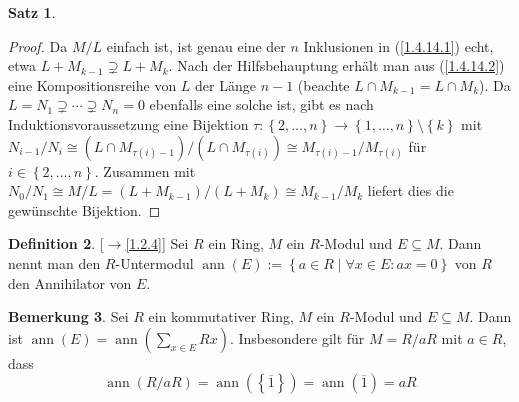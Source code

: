 \documentclass[
twoside=semi,
fontsize=12,
DIV=12, 
cleardoublepage=current,
leqno,
headings=optiontoheadandtoc, 
toc=idx
]{scrbook}
\newcommand{\brac}[1]{\left( #1 \right)}
\newcommand{\set}[1]{\left\{ #1 \right\}}
\DeclareMathOperator{\ann}{ann}
\theoremstyle{definition}
\newtheorem{definition}{Definition}[section]
\newtheorem{bemerkung}[definition]{Bemerkung}
\newtheorem{satz}[definition]{Satz}
\begin{document}
\begin{satz}
\begin{proof}
			\noindent Da $M/L$ einfach ist, ist genau eine der $n$ Inklusionen in (\ref{1.4.14.1}) echt, etwa $L+M_{k-1} \supsetneq L + M_k$. Nach der Hilfsbehauptung erh\"alt man aus (\ref{1.4.14.2}) eine Kompositionsreihe von $L$ der L\"ange $n-1$ (beachte $L\cap M_{k-1} = L\cap M_k$). Da $L=N_1\supsetneq \cdots \supsetneq N_n = 0$ ebenfalls eine solche ist, gibt es nach Induktionsvoraussetzung eine Bijektion $\tau: \set{2, \dots, n} \to \set{1, \dots, n} \setminus \set{k}$ mit $N_{i-1}/N_i \cong (L\cap M_{\tau(i)-1})/(L\cap M_{\tau(i)}) \cong M_{\tau(i)-1} / M_{\tau(i)}$ f\"ur $i \in \set{2,\dots, n}$. Zusammen mit $N_0/N_1 \cong M/L = (L+M_{k-1})/(L+M_k) \cong M_{k-1}/M_k$ liefert dies die gew\"unschte Bijektion.
		\end{proof}
	\end{satz}

	\begin{definition}\label{1.4.15}
		[$\rightarrow$\ref{1.2.4}]\newline
		Sei $R$ ein Ring, $M$ ein $R$-Modul und $E\subseteq M$. Dann nennt man den $R$-Untermodul \linebreak $\ann(E) := \set{a \in R \mid \forall x \in E: ax = 0}$ von $R$ den Annihilator von $E$.
	\end{definition}

	\begin{bemerkung}\label{1.4.16}\hfill\newline
		Sei $R$ ein kommutativer Ring, $M$ ein $R$-Modul und $E\subseteq M$. Dann ist \linebreak $\ann(E)=\ann\brac{\sum_{x\in E} Rx}$. Insbesondere gilt f\"ur $M=R/aR$ mit $a \in R$, dass
			\[\ann(R/aR) = \ann(\set{\overline{1}}) = \ann(\overline{1}) = aR\]
	\end{bemerkung}
\end{document}
